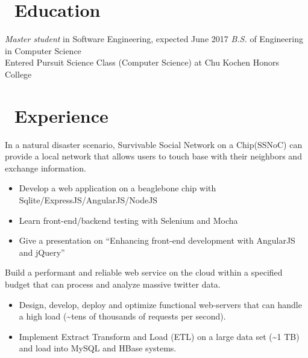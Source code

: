 \documentclass{resume}
\begin{document}


 
\section{\faGraduationCap\ Education}
\textit{Master student} in Software Engineering, expected June 2017
\textit{B.S.} of Engineering in Computer Science\\
Entered Pursuit Science Class (Computer Science) at Chu Kochen Honors College

\section{\faUsers\ Experience}
In a natural disaster scenario, Survivable Social Network on a Chip(SSNoC) can provide a local network that allows
users to touch base with their neighbors and exchange information.
\begin{itemize}
  \item Develop a web application on a beaglebone chip with Sqlite/ExpressJS/AngularJS/NodeJS
  \item Learn front-end/backend testing with Selenium and Mocha
  \item Give a presentation on ``Enhancing front-end development with AngularJS and jQuery''
\end{itemize}

Build a performant and reliable web service on the cloud within a specified budget that can process and analyze massive twitter data.
\begin{itemize}
  \item Design, develop, deploy and optimize functional web-servers that can handle a high load (\~{}tens of thousands of requests per second).
  \item Implement Extract Transform and Load (ETL) on a large data set (\~{}1 TB) and load into MySQL and HBase systems.
\end{itemize}
\end{document}
